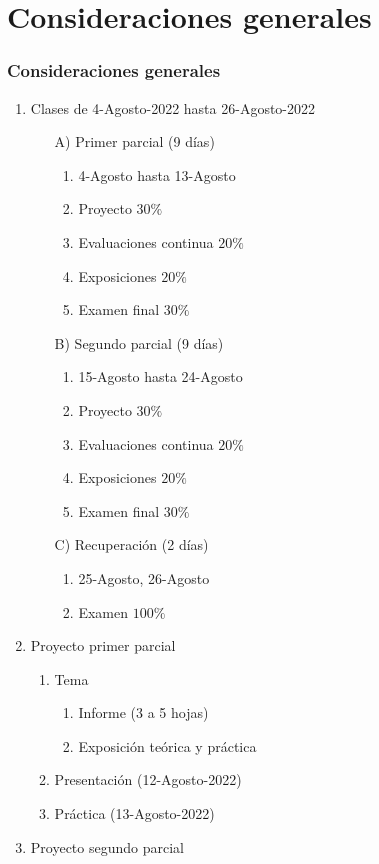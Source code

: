 \documentclass[xcolor=dvipsnames,envcountsect]{beamer}
\begin{document}
\section{Consideraciones generales}
\begin{frame}[allowframebreaks]
	\frametitle{Consideraciones generales}
		\justifying

		
		
		
		
		
		
		\begin{enumerate}
		\item Clases de 4-Agosto-2022 hasta 26-Agosto-2022
			  \begin{enumerate}
			  \item[A)] Primer parcial (9 días)
				   \begin{enumerate}
				   \item  4-Agosto hasta 13-Agosto	
				   \item Proyecto      			$30\%$
				   \item Evaluaciones continua  $20\%$
				   \item Exposiciones 			$20\%$
				   \item Examen final 			$30\%$ 	
				   \end{enumerate}
			   \item[B)] Segundo parcial (9 días)
			 	    \begin{enumerate}
			 		\item 15-Agosto hasta 24-Agosto
				    \item Proyecto      			$30\%$
				    \item Evaluaciones continua  $20\%$
				    \item Exposiciones 			$20\%$
				    \item Examen final 			$30\%$ 	
				     \end{enumerate}
			   \item[C)] Recuperación (2 días)
			 	    \begin{enumerate}
			 		\item 25-Agosto, 26-Agosto
				    \item Examen 			$100\%$ 	
				     \end{enumerate}
				\end{enumerate}
		\item Proyecto primer parcial
				\begin{enumerate}
				
				\item Tema
					\begin{enumerate}
					\item Informe (3 a 5 hojas)
					\item Exposición teórica y práctica 
					\end{enumerate}
				\item Presentación (12-Agosto-2022) 
				\item Práctica (13-Agosto-2022)
				\end{enumerate}
		\item Proyecto segundo parcial
				\begin{enumerate}
				

\end{enumerate}
\end{enumerate}
\end{frame}
\end{document}
